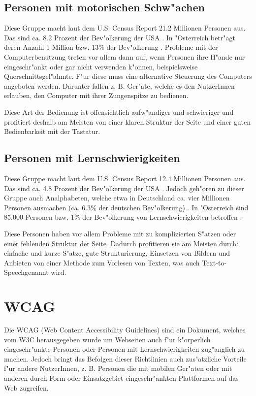 \documentclass[a4paper,bibtotoc,oneside]{scrbook}
\begin{document}
\section{Personen mit motorischen Schw"achen}
Diese Gruppe macht laut dem U.S. Census Report 21.2 Millionen Personen aus. Das
sind ca. 8.2 Prozent der Bev"olkerung der USA \cite[S. 1]{us_cens}. In "Osterreich betr"agt deren Anzahl 1 Million bzw. 13\% der Bev"olkerung \cite[S. 12]{stat_austria}. Probleme mit der Computerbenutzung treten vor allem dann auf, wenn Personen ihre H"ande nur eingeschr"ankt oder gar nicht verwenden k"onnen, beispielsweise Querschnittsgel"ahmte. F"ur diese muss eine alternative Steuerung des Computers angeboten werden. Darunter fallen z. B. Ger"ate, welche es den NutzerInnen erlauben, den Computer mit ihrer Zungenspitze zu bedienen.\cite[S. 15-16]{barr_webd}

Diese Art der Bedienung ist offensichtlich aufw"andiger und schwieriger und profitiert deshalb am Meisten von einer klaren Struktur der Seite und einer guten Bedienbarkeit mit der Tastatur.\cite[S. 15-16]{barr_webd}\cite[S. 18]{understand_acc}

\section{Personen mit Lernschwierigkeiten}
Diese Gruppe macht laut dem U.S. Census Report 12.4 Millionen Personen aus. Das
sind ca. 4.8 Prozent der Bev"olkerung der USA \cite[S. 1]{us_cens}. Jedoch geh"oren zu dieser Gruppe auch Analphabeten, welche etwa in Deutschland ca. vier Millionen Personen ausmachen (ca. 6.3\% der deutschen Bev"olkerung) \cite[S. 19]{understand_acc}. In "Osterreich sind 85.000 Personen bzw. 1\% der Bev"olkerung von Lernschwierigkeiten betroffen \cite[S. 14]{stat_austria}.

Diese Personen haben vor allem Probleme mit zu komplizierten S"atzen oder einer fehlenden Struktur der Seite. Dadurch profitieren sie am Meisten durch: einfache und kurze S"atze, gute Strukturierung, Einsetzen von Bildern und Anbieten von einer Methode zum Vorlesen von Texten, was auch \glqq Text-to-Speech\grqq genannt wird. \cite[S. 18-19]{barr_webd}\cite[S. 19]{understand_acc}

\chapter{WCAG}
Die WCAG (Web Content Accessibility Guidelines) sind ein Dokument, welches vom W3C herausgegeben wurde um Webseiten auch f"ur k"orperlich eingeschr"ankte Personen oder Personen mit Lernschwierigkeiten zug"anglich zu machen. Jedoch bringt das Befolgen dieser Richtlinien auch zus"atzliche Vorteile f"ur andere NutzerInnen, z. B. Personen die mit mobilen Ger"aten oder mit anderen durch Form oder Einsatzgebiet eingeschr"ankten Plattformen auf das Web zugreifen. \cite[Abschnitt Abstract]{wcag1}
\end{document}
